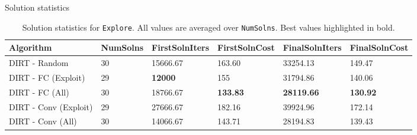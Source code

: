 \begin{columns}[t]
\begin{column}{0.68\textwidth}
\begin{block}{\large Solution statistics}
\begin{table}[]
{				\vspace{-.1in}}
			\end{table}
			\vspace{0.1in}
			\begin{table}[]
				\centering
				\begin{tabular}{|l|l|l|l|l|l|}
				\hline
				\textbf{Algorithm}    & \textbf{NumSolns} & \textbf{FirstSolnIters} & \textbf{FirstSolnCost} & \textbf{FinalSolnIters} & \textbf{FinalSolnCost} \\
				[0.5ex] \hline
				DIRT - Random         & 30                & 15666.67                & 163.60                 & 33254.13                & 149.47                 \\ \hline
				DIRT - FC (Exploit)   & 29                & \textbf{12000}                   & 155                    & 31794.86                & 140.06                 \\ \hline
				DIRT - FC (All)       & 30                & 18766.67                & \textbf{133.83}                 & \textbf{28119.66}                & \textbf{130.92}                 \\ \hline
				DIRT - Conv (Exploit) & 29                & 27666.67                & 182.16                 & 39924.96                & 172.14                 \\ \hline
				DIRT - Conv (All)     & 30                & 14066.67                & 143.71                 & 28194.83                & 139.43                 \\ \hline
				\end{tabular}
				\vspace{.1in}
				\caption{Solution statistics for \texttt{Explore}. All values are averaged over \texttt{NumSolns}. Best values highlighted in bold.
				\vspace{-.1in}}
			\end{table}
			

\end{block}
\end{column}
\end{columns}
